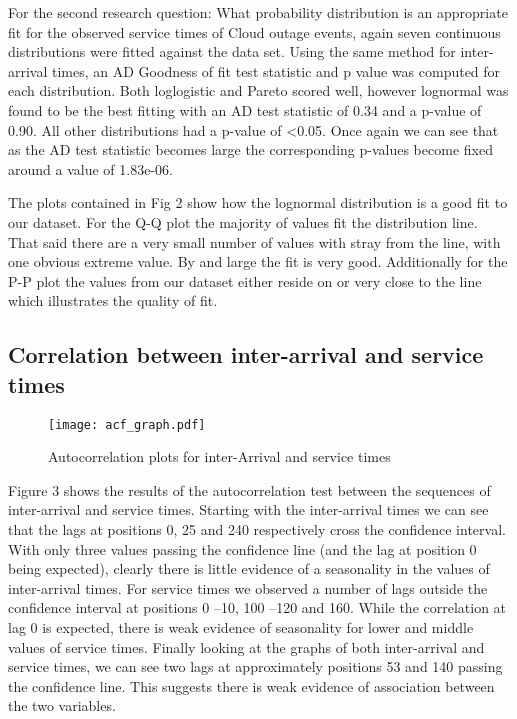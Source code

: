 \documentclass[5p]{elsarticle}
\begin{document}
For the second research question: What probability distribution is an appropriate fit for the observed service times of Cloud outage events, again seven continuous distributions were fitted against the data set. Using the same method for inter-arrival times, an AD Goodness of fit test statistic and p value was computed for each distribution. Both loglogistic and Pareto scored well, however lognormal was found to be the best fitting with an AD test statistic of 0.34 and a p-value of 0.90. All other distributions had a p-value of \textless 0.05. Once again we can see that as the AD test statistic becomes large the corresponding p-values become fixed around a value of 1.83e-06.

The plots contained in Fig 2 show how the lognormal distribution is a good fit to our dataset. For the Q-Q plot the majority of values fit the distribution line. That said there are a very small number of values with stray from the line, with one obvious extreme value. By and large the fit is very good. Additionally for the P-P plot the values from our dataset either reside on or very close to the line which illustrates the quality of fit.

\subsection{Correlation between inter-arrival and service times}

\begin{figure*}[]
\begin{center}
\texttt{[image: acf\_graph.pdf]} 
\caption{Autocorrelation plots for inter-Arrival and service times}
\end{center}
\label{fig:acfgraphs}
\end{figure*}

Figure 3 shows the results of the autocorrelation test between the sequences of inter-arrival and service times. Starting with the inter-arrival times we can see that the lags at positions 0, 25 and 240 respectively cross the confidence interval. With only three values passing the confidence line (and the lag at position 0 being expected), clearly there is little evidence of a seasonality in the values of inter-arrival times. For service times we observed a number of lags outside the confidence interval at positions 0 --10, 100 --120 and 160. While the correlation at lag 0 is expected, there is weak evidence of seasonality for lower and middle values of service times. Finally looking at the graphs of both inter-arrival and service times, we can see two lags at approximately positions 53 and 140 passing the confidence line. This suggests there is weak evidence of association between the two variables.
\end{document}
